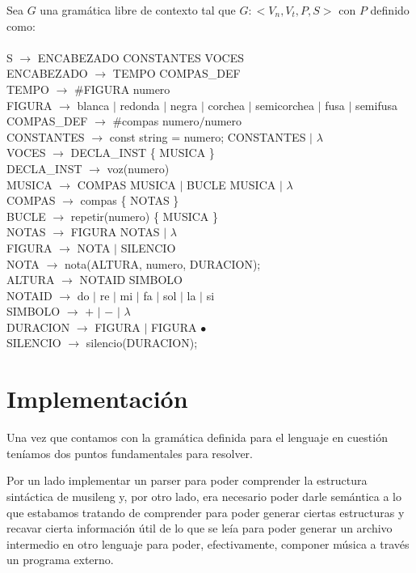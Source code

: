 Sea $G$ una gramática libre de contexto tal que $G: <V_n, V_t, P, S>$ con $P$ definido como: \\
\\
S $\rightarrow$ ENCABEZADO CONSTANTES VOCES \\
ENCABEZADO $\rightarrow$ TEMPO COMPAS\_DEF \\
TEMPO $\rightarrow$ \#FIGURA numero \\
FIGURA $\rightarrow$ blanca $\mid$ redonda $\mid$ negra $\mid$ corchea $\mid$ semicorchea $\mid$ fusa $\mid$ semifusa \\
COMPAS\_DEF $\rightarrow$ \#compas numero$/$numero  \\
CONSTANTES $\rightarrow$ const string = numero; CONSTANTES $\mid$ $\lambda$ \\
VOCES $\rightarrow$ DECLA\_INST \{ MUSICA \} \\
DECLA\_INST $\rightarrow$ voz(numero) \\
MUSICA $\rightarrow$ COMPAS MUSICA $\mid$ BUCLE MUSICA $\mid$ $\lambda$ \\
COMPAS $\rightarrow$ compas \{ NOTAS \} \\
BUCLE $\rightarrow$ repetir(numero) \{ MUSICA \} \\
NOTAS $\rightarrow$ FIGURA NOTAS $\mid$ $\lambda$ \\
FIGURA $\rightarrow$ NOTA $\mid$ SILENCIO \\
NOTA $\rightarrow$ nota(ALTURA, numero, DURACION); \\
ALTURA $\rightarrow$ NOTAID SIMBOLO \\
NOTAID $\rightarrow$ do $\mid$ re $\mid$ mi $\mid$ fa $\mid$ sol $\mid$ la $\mid$ si \\
SIMBOLO $\rightarrow$ $+$ $\mid$ $-$ $\mid$ $\lambda$ \\
DURACION $\rightarrow$ FIGURA $\mid$ FIGURA $\bullet$ \\
SILENCIO $\rightarrow$ silencio(DURACION); \\



\section{Implementación}

Una vez que contamos con la gramática definida para el lenguaje en cuestión teníamos dos puntos fundamentales para resolver. 

Por un lado implementar un parser para poder comprender la estructura sintáctica de musileng y, por otro lado, 
era necesario poder darle semántica a lo que estabamos tratando de comprender para poder generar ciertas estructuras y recavar 
cierta información útil de lo que se leía para poder generar un archivo intermedio en otro lenguaje para poder, efectivamente,
componer música a través un programa externo.

